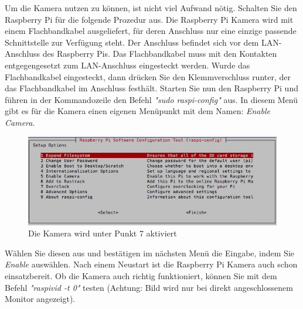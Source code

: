 \documentclass[12pt,a4paper]{scrreprt}
\begin{document}
Um die Kamera nutzen zu können, ist nicht viel Aufwand nötig. Schalten Sie den Raspberry Pi für die folgende Prozedur aus. Die Raspberry Pi Kamera wird mit einem Flachbandkabel ausgeliefert, für deren Anschluss nur eine einzige passende Schnittstelle zur Verfügung steht. Der Anschluss befindet sich vor dem LAN-Anschluss des Raspberry Pis. Das Flachbandkabel muss mit den Kontakten entgegengesetzt zum LAN-Anschluss eingesteckt werden. Wurde das Flachbandkabel eingesteckt, dann drücken Sie den Klemmverschluss runter, der das Flachbandkabel im Anschluss festhält. Starten Sie nun den Raspberry Pi und führen in der Kommandozeile den Befehl \textit{"sudo raspi-config"} aus. In diesem Menü gibt es für die Kamera einen eigenen Menüpunkt mit dem Namen: \textit{Enable Camera}.\begin{figure}[h] \includegraphics[width=15.8cm]{raspiconfig} \caption{Die Kamera wird unter Punkt 7 aktiviert} \end{figure} Wählen Sie diesen aus und bestätigen im nächsten Menü die Eingabe, indem Sie \textit{Enable} auswählen. Nach einem Neustart ist die Raspberry Pi Kamera auch schon einsatzbereit. Ob die Kamera auch richtig funktioniert, können Sie mit dem Befehl \textit{"raspivid -t 0"} testen (Achtung: Bild wird nur bei direkt angeschlossenem Monitor angezeigt). 
\end{document}
